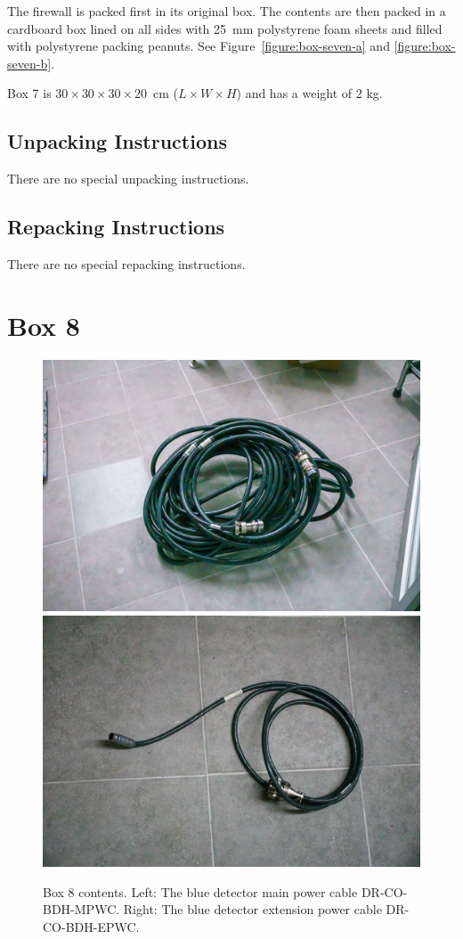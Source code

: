 \documentclass{article}
\begin{document}
The firewall is packed first in its original box. The contents are then packed in a cardboard box lined on all sides with 25~mm polystyrene foam sheets and filled with polystyrene packing peanuts. See Figure~\ref{figure:box-seven-a} and \ref{figure:box-seven-b}.

Box 7 is $30 \times 30 \times 30 \times 20$~cm ($L \times W \times H$) and has a weight of 2 kg.

\subsection{Unpacking Instructions}

There are no special unpacking instructions.

\subsection{Repacking Instructions}

There are no special repacking instructions.


\clearpage
\section{Box 8}

\begin{figure}[bp]
\begin{center}
\includegraphics[width=0.45\linewidth]{figures/20201207T191558.jpg}
\includegraphics[width=0.45\linewidth]{figures/20201207T191616.jpg}
\end{center}
\caption{Box 8 contents. Left: The blue detector main power cable DR-CO-BDH-MPWC. Right: The blue detector extension power cable DR-CO-BDH-EPWC.}
\label{figure:box-eight-contents}
\end{figure}
\end{document}

